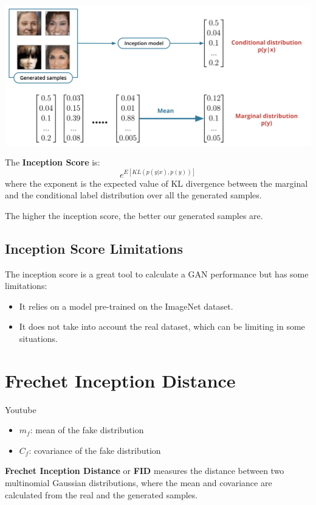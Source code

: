 \includegraphics[width=1\linewidth]{img//genAdvNet//deepGAN/screen-shot-2022-05-10-at-2.21.02-pm.jpeg}

The \textbf{Inception Score} is: \[e^{E[KL(p(y|x), p(y))]}\]
where the exponent is the expected value of KL divergence between the marginal and the conditional label distribution over all the generated samples. \newline

The higher the inception score, the better our generated samples are.
\subsection{Inception Score Limitations}
The inception score is a great tool to calculate a GAN performance but has some limitations:
\begin{itemize}
    \item It relies on a model pre-trained on the ImageNet dataset.
    \item It does not take into account the real dataset, which can be limiting in some situations.
\end{itemize}

\section{Frechet Inception Distance}
Youtube


\begin{itemize}
    \item \(m_f\): mean of the fake distribution
    \item \(C_f\): covariance of the fake distribution
\end{itemize}
\textbf{Frechet Inception Distance} or \textbf{FID} measures the distance between two multinomial Gaussian distributions, where the mean and covariance are calculated from the real and the generated samples.

